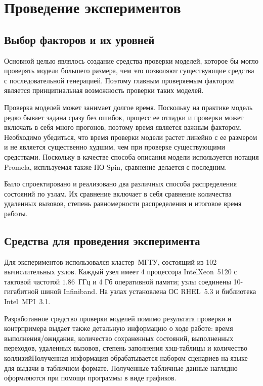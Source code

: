 \chapter{Проведение экспериментов}
\label{cha:experiments}

\section{Выбор факторов и их уровней}
\label{sec:experiment-strategy}

Основной целью являлось создание средства проверки моделей, которое бы могло проверять
модели б\'{о}льшего размера, чем это позволяют существующие средства с последовательной
генерацией. Поэтому главным проверяемым фактором является принципиальная возможность
проверки таких моделей. 

Проверка моделей может занимает долгое время. Поскольку на практике модель редко бывает
задана сразу без ошибок, процесс ее отладки и проверки может включать в себя много
прогонов, поэтому время является важным фактором. Необходимо убедиться, что время проверки
модели растет линейно с ее размером и не является существенно худшим, чем при проверке
существующими средствами. Поскольку в качестве способа описания модели используется
нотация Promela, испльзуемая также ПО Spin, сравнение делается с последним.

Было спроектировано и реализовано два различных способа распределения состояний по
узлам. Их сравнение включает в себя сравнение количества удаленных вызовов, степень
равномерности распределения и итоговое время работы.

\section{Средства для проведения эксперимента}
\label{sec:experiment-idef0}

Для экспериментов использовался кластер~МГТУ, состоящий из 102 вычислительных
узлов. Каждый узел имеет 4 процессора Intel\regsign Xeon\regsign~5120 с тактовой частотой
$1.86$~ГГц и 4 Гб оперативной памяти; узлы соединены 10-гигабитной шиной Infiniband. На
узлах установлена ОС RHEL~5.3 и библиотека Intel~MPI~3.1.

Разработанное средство проверки моделей помимо результата проверки и контрпримера выдает
также детальную информацию о ходе работе: время выполнения/ожидания, количество
сохраненных состояний, выполненных переходов, удаленных вызовов, степень заполнения
хэш-таблицы и количество коллизий\etc Полученная информация обрабатывается набором
сценариев на языке  для выдачи в табличном формате. Полученные табличные
данные наглядно оформляются при помощи программы  в виде графиков.

